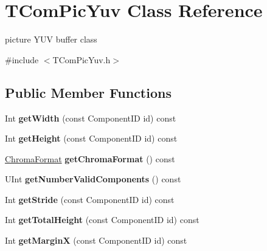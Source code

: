 \hypertarget{class_t_com_pic_yuv}{}\section{T\+Com\+Pic\+Yuv Class Reference}
\label{class_t_com_pic_yuv}


picture Y\+UV buffer class  




{\ttfamily \#include $<$T\+Com\+Pic\+Yuv.\+h$>$}

\subsection*{Public Member Functions}
\begin{DoxyCompactItemize}
\item 
\mbox{\label{class_t_com_pic_yuv_a7e414e42fb5e052ea33774d3e7474ffd}} 
Int {\bfseries get\+Width} (const Component\+ID id) const
\item 
\mbox{\label{class_t_com_pic_yuv_ac952dd04f0465a3f22be37ab70c6c526}} 
Int {\bfseries get\+Height} (const Component\+ID id) const
\item 
\mbox{\label{class_t_com_pic_yuv_a7be0bde6d4fc600836085ed135d5ec02}} 
\hyperlink{_type_def_8h_a4a6c51c10f2eb04abc7209db7caff39f}{Chroma\+Format} {\bfseries get\+Chroma\+Format} () const
\item 
\mbox{\label{class_t_com_pic_yuv_abae33190861be593a27775d1171e33c7}} 
U\+Int {\bfseries get\+Number\+Valid\+Components} () const
\item 
\mbox{\label{class_t_com_pic_yuv_a8868c49ea8c92019cd6ccbe915cb8cd8}} 
Int {\bfseries get\+Stride} (const Component\+ID id) const
\item 
\mbox{\label{class_t_com_pic_yuv_ad7c9d98422832bf68f299caa68ad7a64}} 
Int {\bfseries get\+Total\+Height} (const Component\+ID id) const
\item 
\mbox{\label{class_t_com_pic_yuv_af85a03927646cc9717a3fa30c5c96246}} 
Int {\bfseries get\+MarginX} (const Component\+ID id) const
\item 

\end{DoxyCompactItemize}
